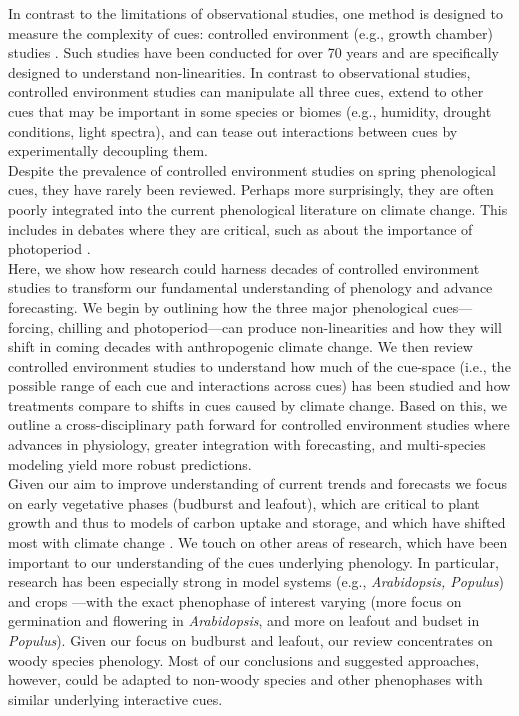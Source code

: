 \documentclass[11pt,letter]{article}
\begin{document}
In contrast to the limitations of observational studies, one method is designed to measure the complexity of cues: controlled environment (e.g., growth chamber) studies \citep{nagano2012,satake2013}. Such studies have been conducted for over 70 years and are specifically designed to understand non-linearities. In contrast to observational studies, controlled environment studies can manipulate all three cues, extend to other cues that may be important in some species or biomes (e.g., humidity, drought conditions, light spectra), and can tease out interactions between cues by experimentally decoupling them.\\

Despite the prevalence of controlled environment studies on spring phenological cues, they have rarely been reviewed. Perhaps more surprisingly, they are often poorly integrated into the current phenological literature on climate change. This includes in debates where they are critical, such as about the importance of photoperiod \citep[e.g.,][]{fu2015,richardson2018}.\\

Here, we show how research could harness decades of controlled environment studies to transform our fundamental understanding of phenology and advance forecasting. We begin by outlining how the three major phenological cues---forcing, chilling and photoperiod---can produce non-linearities and how they will shift in coming decades with anthropogenic climate change. We then review controlled environment studies to understand how much of the cue-space (i.e., the possible range of each cue and interactions across cues) has been studied and how treatments compare to shifts in cues caused by climate change. Based on this, we outline a cross-disciplinary path forward for controlled environment studies where advances in physiology, greater integration with forecasting, and multi-species modeling yield more robust predictions.\\

Given our aim to improve understanding of current trends and forecasts we focus on early vegetative phases (budburst and leafout), which are critical to plant growth and thus to models of carbon uptake and storage, and which have shifted most with climate change \citep{Cleland:2007or,IPCC:2014sm}. We touch on other areas of research, which have been important to our understanding of the cues underlying phenology. In particular, research has been especially strong in model systems (e.g., \emph{Arabidopsis, Populus}) and crops \citep{cesaraccio2004}---with the exact phenophase of interest varying (more focus on germination and flowering in \emph{Arabidopsis}, and more on leafout and budset in \emph{Populus}).  Given our focus on budburst and leafout, our review concentrates on woody species phenology. Most of our conclusions and suggested approaches, however, could be adapted to non-woody species and other phenophases with similar underlying interactive cues. \\
\end{document}
